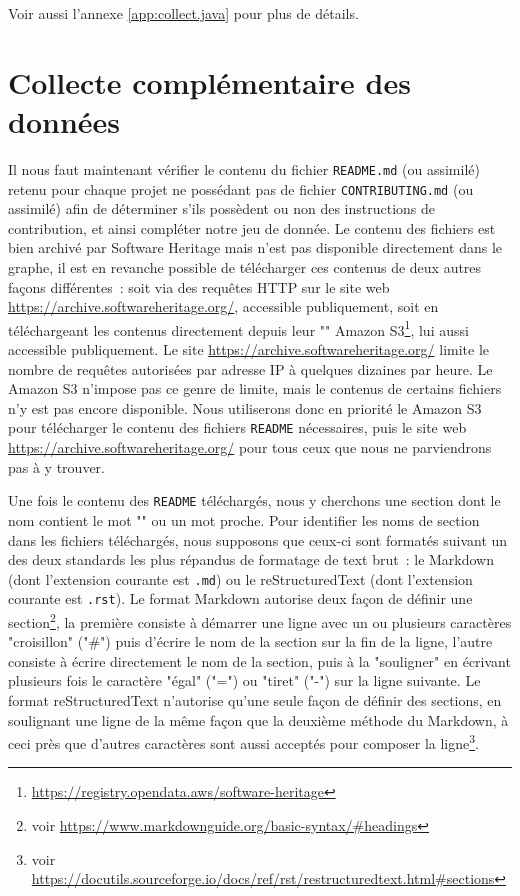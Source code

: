 Voir aussi l'annexe \ref{app:collect.java} pour plus de détails.

\section{Collecte complémentaire des données}
\label{sec:collectreadme}

Il nous faut maintenant vérifier le contenu du fichier \texttt{README.md} (ou assimilé) retenu pour chaque
projet ne possédant pas de fichier \texttt{CONTRIBUTING.md} (ou assimilé) afin de déterminer s'ils possèdent
ou non des instructions de contribution, et ainsi compléter notre jeu de donnée. Le contenu des fichiers est
bien archivé par Software Heritage mais n'est pas disponible directement dans le graphe, il est en revanche
possible de télécharger ces contenus de deux autres façons différentes : soit via des requêtes HTTP sur le
site web \url{https://archive.softwareheritage.org/}, accessible publiquement, soit en téléchargeant les
contenus directement depuis leur "" Amazon
S3\footnote{\url{https://registry.opendata.aws/software-heritage}}, lui aussi accessible publiquement. Le site
\url{https://archive.softwareheritage.org/} limite le nombre de requêtes autorisées par adresse IP à quelques
dizaines par heure. Le  Amazon S3 n'impose pas ce genre de limite, mais le contenus de certains
fichiers n'y est pas encore disponible. Nous utiliserons donc en priorité le  Amazon S3 pour
télécharger le contenu des fichiers \texttt{README} nécessaires, puis le site web
\url{https://archive.softwareheritage.org/} pour tous ceux que nous ne parviendrons pas à y trouver.

Une fois le contenu des \texttt{README} téléchargés, nous y cherchons une section dont le nom contient le mot
"" ou un mot proche. Pour identifier les noms de section dans les fichiers téléchargés, nous
supposons que ceux-ci sont formatés suivant un des deux standards les plus répandus de formatage de text
brut : le Markdown (dont l'extension courante est \texttt{.md}) ou le reStructuredText (dont l'extension
courante est \texttt{.rst}). Le format Markdown autorise deux façon de définir une section\footnote{voir
\url{https://www.markdownguide.org/basic-syntax/\#headings}}, la première consiste à démarrer une ligne avec
un ou plusieurs caractères "croisillon" ("\#") puis d'écrire le nom de la section sur la fin de la ligne,
l'autre consiste à écrire directement le nom de la section, puis à la "souligner" en écrivant plusieurs fois
le caractère "égal" ("=") ou "tiret" ("-") sur la ligne suivante. Le format reStructuredText n'autorise qu'une
seule façon de définir des sections, en soulignant une ligne de la même façon que la deuxième méthode du
Markdown, à ceci près que d'autres caractères sont aussi acceptés pour composer la ligne\footnote{voir
\url{https://docutils.sourceforge.io/docs/ref/rst/restructuredtext.html\#sections}}.

